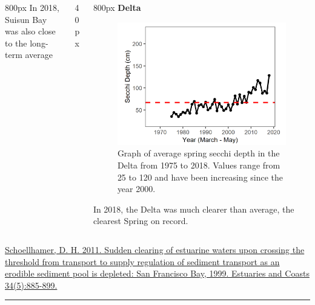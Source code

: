 \documentclass[
]{book}
\begin{document}
\begin{columns}[T]
\begin{column}{800px\textwidth}
In 2018, Suisun Bay was also close to the long-term average
\end{column}

\begin{column}{40px\textwidth}
~
\end{column}

\begin{column}{800px\textwidth}
\textbf{Delta}

\begin{figure}
\includegraphics[width=15.25in]{figures/secchi_dtspring} \caption{Graph of average spring secchi depth in the Delta from 1975 to 2018. Values range from 25 to 120 and have been increasing since the year 2000.}\label{fig:unnamed-chunk-10}
\end{figure}

In 2018, the Delta was much clearer than average, the clearest Spring on record.
\end{column}
\end{columns}

\begin{disclaimer}
\href{https://link.springer.com/article/10.1007/s12237-011-9382-x}{Schoellhamer,
D. H. 2011. Sudden clearing of estuarine waters upon crossing the
threshold from transport to supply regulation of sediment transport as
an erodible sediment pool is depleted: San Francisco Bay, 1999.
Estuaries and Coasts 34(5):885-899.}
\end{disclaimer}

\begin{center}\rule{0.5\linewidth}{0.5pt}\end{center}
\end{document}
